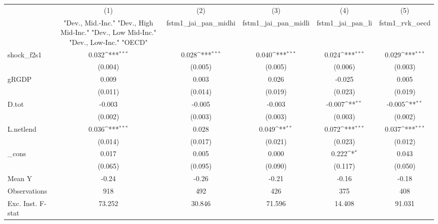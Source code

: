 {
\def\sym#1{\ifmmode^{#1}\else\(^{#1}\)\fi}
\begin{tabular}{l*{5}{c}}
\toprule
            &\multicolumn{1}{c}{(1)}&\multicolumn{1}{c}{(2)}&\multicolumn{1}{c}{(3)}&\multicolumn{1}{c}{(4)}&\multicolumn{1}{c}{(5)}\\
            &\multicolumn{1}{c}{ "Dev., Mid.-Inc." "Dev., High Mid-Inc." "Dev., Low Mid-Inc." "Dev., Low-Inc." "OECD" }&\multicolumn{1}{c}{fstm1\_jai\_pan\_midhi}&\multicolumn{1}{c}{fstm1\_jai\_pan\_midli}&\multicolumn{1}{c}{fstm1\_jai\_pan\_li}&\multicolumn{1}{c}{fstm1\_rvk\_oecd}\\
\midrule
shock\_f2s1  &       0.032\sym{***}&       0.028\sym{***}&       0.040\sym{***}&       0.024\sym{***}&       0.029\sym{***}\\
            &     (0.004)         &     (0.005)         &     (0.005)         &     (0.006)         &     (0.003)         \\
\addlinespace
gRGDP       &       0.009         &       0.003         &       0.026         &      -0.025         &       0.005         \\
            &     (0.011)         &     (0.014)         &     (0.019)         &     (0.023)         &     (0.019)         \\
\addlinespace
D.tot       &      -0.003         &      -0.005         &      -0.003         &      -0.007\sym{**} &      -0.005\sym{**} \\
            &     (0.002)         &     (0.003)         &     (0.003)         &     (0.003)         &     (0.002)         \\
\addlinespace
L.netlend   &       0.036\sym{***}&       0.028         &       0.049\sym{**} &       0.072\sym{***}&       0.037\sym{***}\\
            &     (0.014)         &     (0.017)         &     (0.021)         &     (0.023)         &     (0.012)         \\
\addlinespace
\_cons      &       0.017         &       0.005         &       0.000         &       0.222\sym{*}  &       0.043         \\
            &     (0.065)         &     (0.095)         &     (0.090)         &     (0.117)         &     (0.050)         \\
\midrule
Mean Y      &       -0.24         &       -0.26         &       -0.21         &       -0.16         &       -0.18         \\
Observations&         918         &         492         &         426         &         375         &         408         \\
Exc. Inst. F-stat&      73.252         &      30.846         &      71.596         &      14.408         &      91.031         \\
\bottomrule
\end{tabular}
}
